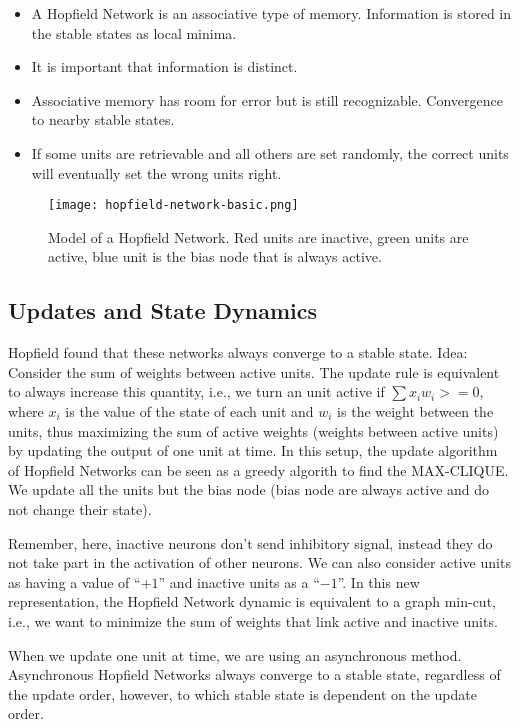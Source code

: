 \documentclass[main]{subfiles}
\begin{document}
\begin{itemize}[noitemsep,nolistsep]
	\item A Hopfield Network is an associative type of memory. Information is stored in the stable states as local minima.
	\item It is important that information is distinct.
	\item Associative memory has room for error but is still recognizable. Convergence to nearby stable states.
	\item If some units are retrievable and all others are set randomly, the correct units will eventually set the wrong units right.
\end{itemize}

\begin{figure}[H]
	\centering
	\texttt{[image: hopfield-network-basic.png]}
	\caption{Model of a Hopfield Network. Red units are inactive, green units are active, blue unit is the bias node that is always active.}
\end{figure}

\subsection{Updates and State Dynamics}

Hopfield found that these networks always converge to a stable state.
Idea: Consider the sum of weights between active units.
The update rule is equivalent to always increase this quantity, i.e., we turn an unit active if $\sum x_i w_i >= 0$, where $x_i$ is the value of the state of each unit and $w_i$ is the weight between the units, thus maximizing the sum of active weights (weights between active units) by updating the output of one unit at time.
In this setup, the update algorithm of Hopfield Networks can be seen as a greedy algorith to find the MAX-CLIQUE.
We update all the units but the bias node (bias node are always active and do not change their state).

Remember, here, inactive neurons don't send inhibitory signal, instead they do not take part in the activation of other neurons.
We can also consider active units as having a value of ``$+1$'' and inactive units as a ``$-1$''.
In this new representation, the Hopfield Network dynamic is equivalent to a graph min-cut, i.e., we want to minimize the sum of weights that link active and inactive units.

When we update one unit at time, we are using an asynchronous method.
Asynchronous Hopfield Networks always converge to a stable state, regardless of the update order, however, to which stable state is dependent on the update order.
\end{document}
